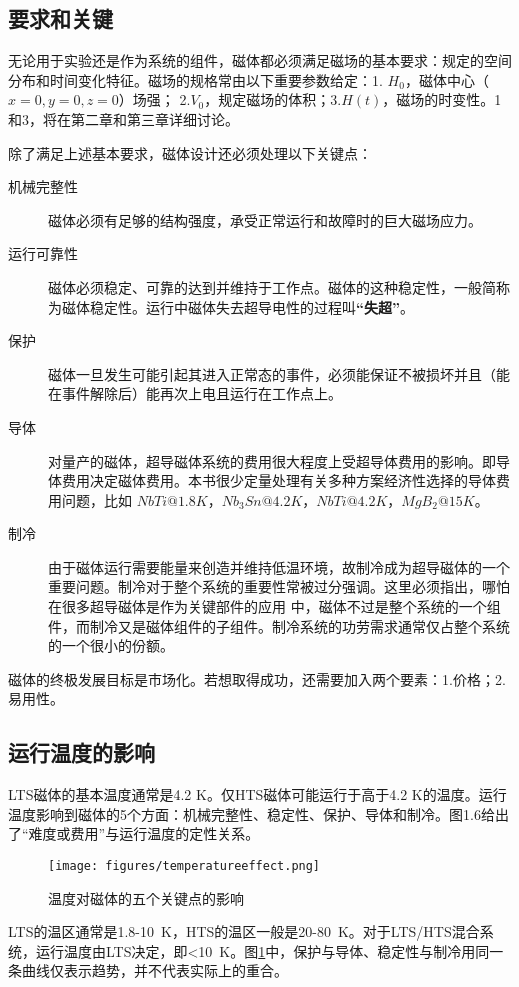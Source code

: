 \subsection{要求和关键}
无论用于实验还是作为系统的组件，磁体都必须满足磁场的基本要求：规定的空间分布和时间变化特征。磁场的规格常由以下重要参数给定：1. $H_0$，磁体中心（$x=0, y=0, z=0$）场强；
2.$V_0$，规定磁场的体积；3.$H(t)$，磁场的时变性。1和3，将在第二章和第三章详细讨论。

除了满足上述基本要求，磁体设计还必须处理以下关键点：
\begin{description}
  \item[机械完整性] 磁体必须有足够的结构强度，承受正常运行和故障时的巨大磁场应力。
  \item[运行可靠性] 磁体必须稳定、可靠的达到并维持于工作点。磁体的这种稳定性，一般简称为磁体稳定性。运行中磁体失去超导电性的过程叫\textbf{“失超”}。
  \item[保护] 磁体一旦发生可能引起其进入正常态的事件，必须能保证不被损坏并且（能在事件解除后）能再次上电且运行在工作点上。
  \item[导体] 对量产的磁体，超导磁体系统的费用很大程度上受超导体费用的影响。即导体费用决定磁体费用。本书很少定量处理有关多种方案经济性选择的导体费用问题，比如
$NbTi@1.8K$，$Nb_3Sn@4.2K$，$NbTi@4.2K$，$MgB_2@15K$。
  \item[制冷] 由于磁体运行需要能量来创造并维持低温环境，故制冷成为超导磁体的一个重要问题。制冷对于整个系统的重要性常被过分强调。这里必须指出，哪怕在很多超导磁体是作为关键部件的应用
  中，磁体不过是整个系统的一个组件，而制冷又是磁体组件的子组件。制冷系统的功劳需求通常仅占整个系统的一个很小的份额。
\end{description}

磁体的终极发展目标是市场化。若想取得成功，还需要加入两个要素：1.价格；2.易用性。

\subsection{运行温度的影响}
LTS磁体的基本温度通常是4.2 K。仅HTS磁体可能运行于高于4.2 K的温度。运行温度影响到磁体的5个方面：机械完整性、稳定性、保护、导体和制冷。图1.6给出了“难度或费用”与运行温度的定性关系。
\begin{figure}
  \centering
 \texttt{[image: figures/temperatureeffect.png]}
  \caption{
温度对磁体的五个关键点的影响
}\label{temperatureeffect}
\end{figure}
LTS的温区通常是1.8-10\ K，HTS的温区一般是20-80\ K。对于LTS/HTS混合系统，运行温度由LTS决定，即<10\ K。图\ref{temperatureeffect}中，保护与导体、稳定性与制冷用同一条曲线仅表示趋势，并不代表实际上的重合。

